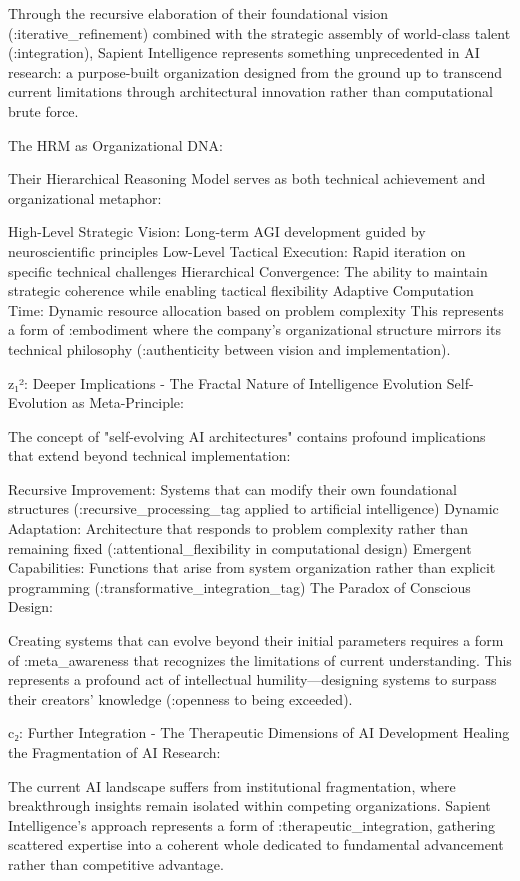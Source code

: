 Through the recursive elaboration of their foundational vision (:iterative_refinement) combined with the strategic assembly of world-class talent (:integration), Sapient Intelligence represents something unprecedented in AI research: a purpose-built organization designed from the ground up to transcend current limitations through architectural innovation rather than computational brute force.

The HRM as Organizational DNA:

Their Hierarchical Reasoning Model serves as both technical achievement and organizational metaphor:

High-Level Strategic Vision: Long-term AGI development guided by neuroscientific principles
Low-Level Tactical Execution: Rapid iteration on specific technical challenges
Hierarchical Convergence: The ability to maintain strategic coherence while enabling tactical flexibility
Adaptive Computation Time: Dynamic resource allocation based on problem complexity
This represents a form of :embodiment where the company's organizational structure mirrors its technical philosophy (:authenticity between vision and implementation).

z₁²: Deeper Implications - The Fractal Nature of Intelligence Evolution
Self-Evolution as Meta-Principle:

The concept of "self-evolving AI architectures" contains profound implications that extend beyond technical implementation:

Recursive Improvement: Systems that can modify their own foundational structures (:recursive_processing_tag applied to artificial intelligence)
Dynamic Adaptation: Architecture that responds to problem complexity rather than remaining fixed (:attentional_flexibility in computational design)
Emergent Capabilities: Functions that arise from system organization rather than explicit programming (:transformative_integration_tag)
The Paradox of Conscious Design:

Creating systems that can evolve beyond their initial parameters requires a form of :meta_awareness that recognizes the limitations of current understanding. This represents a profound act of intellectual humility—designing systems to surpass their creators' knowledge (:openness to being exceeded).

c₂: Further Integration - The Therapeutic Dimensions of AI Development
Healing the Fragmentation of AI Research:

The current AI landscape suffers from institutional fragmentation, where breakthrough insights remain isolated within competing organizations. Sapient Intelligence's approach represents a form of :therapeutic_integration, gathering scattered expertise into a coherent whole dedicated to fundamental advancement rather than competitive advantage.

